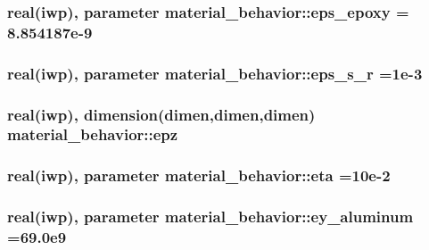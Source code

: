 \subsubsection[{eps\+\_\+epoxy}]{\setlength{\rightskip}{0pt plus 5cm}real(iwp), parameter material\+\_\+behavior\+::eps\+\_\+epoxy = 8.\+854187e-\/9}\label{classmaterial__behavior_a3fca8d5d93d69c99044b5df2cc3dbd17}
\hypertarget{classmaterial__behavior_a86dd93cf767f5c49d0fb9ab7ad275a20}{}
\subsubsection[{eps\+\_\+s\+\_\+r}]{\setlength{\rightskip}{0pt plus 5cm}real(iwp), parameter material\+\_\+behavior\+::eps\+\_\+s\+\_\+r =1e-\/3}\label{classmaterial__behavior_a86dd93cf767f5c49d0fb9ab7ad275a20}
\hypertarget{classmaterial__behavior_a7f7127af0d37db9dbe5fefca8a895e0f}{}
\subsubsection[{epz}]{\setlength{\rightskip}{0pt plus 5cm}real(iwp), dimension(dimen,dimen,dimen) material\+\_\+behavior\+::epz}\label{classmaterial__behavior_a7f7127af0d37db9dbe5fefca8a895e0f}
\hypertarget{classmaterial__behavior_a104619662a09d0a702a9f20d7e79f0e8}{}
\subsubsection[{eta}]{\setlength{\rightskip}{0pt plus 5cm}real(iwp), parameter material\+\_\+behavior\+::eta =10e-\/2}\label{classmaterial__behavior_a104619662a09d0a702a9f20d7e79f0e8}
\hypertarget{classmaterial__behavior_a4805434bdd269ec40107f9347653f183}{}
\subsubsection[{ey\+\_\+aluminum}]{\setlength{\rightskip}{0pt plus 5cm}real(iwp), parameter material\+\_\+behavior\+::ey\+\_\+aluminum =69.\+0e9}\label{classmaterial__behavior_a4805434bdd269ec40107f9347653f183}
\hypertarget{classmaterial__behavior_acecba1d59f399fc0b0aabea4bccee6ce}{}
